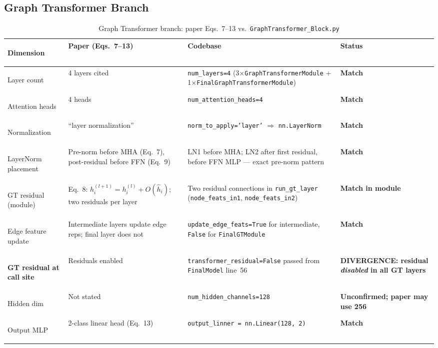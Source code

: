 \documentclass[10pt, a4paper]{article}
\newcommand{\match}[1]{\textcolor{okgreen}{\textbf{#1}}}
\newcommand{\mismatch}[1]{\textcolor{warnorange}{\textbf{#1}}}
\newcommand{\warn}[1]{\textcolor{warnorange}{\textbf{#1}}}
\newcommand{\code}[1]{\texttt{\small #1}}
\begin{document}
\subsection{Graph Transformer Branch}

\begin{table}[ht]
\caption{Graph Transformer branch: paper Eqs.\ 7--13 vs.\ \code{GraphTransformer\_Block.py}}
\label{tab:gt_compare}
\begin{tabularx}{\linewidth}{>{\footnotesize\bfseries\raggedright\arraybackslash}p{2.6cm} Y Y
    >{\footnotesize\centering\arraybackslash}p{2.8cm}}
\toprule
\normalsize\textbf{Dimension} & \normalsize\textbf{Paper (Eqs.\ 7--13)} & \normalsize\textbf{Codebase} & \normalsize\textbf{Status} \\
\midrule
Layer count &
  4 layers cited &
  \code{num\_layers=4} (3$\times$\code{GraphTransformerModule} + 1$\times$\code{FinalGraphTransformerModule}) &
  \match{Match} \\
\addlinespace
Attention heads & 4 heads & \code{num\_attention\_heads=4} & \match{Match} \\
\addlinespace
Normalization &
  ``layer normalization'' &
  \code{norm\_to\_apply='layer'} $\Rightarrow$ \code{nn.LayerNorm} &
  \match{Match} \\
\addlinespace
LayerNorm placement &
  Pre-norm before MHA (Eq.\ 7), post-residual before FFN (Eq.\ 9) &
  LN1 before MHA; LN2 after first residual, before FFN MLP --- exact pre-norm pattern &
  \match{Match} \\
\addlinespace
GT residual (module) &
  Eq.\ 8: $h_i^{(l+1)} = h_i^{(l)} + O(\hat{h}_i)$; two residuals per layer &
  Two residual connections in \code{run\_gt\_layer} (\code{node\_feats\_in1}, \code{node\_feats\_in2}) &
  \match{Match in module} \\
\addlinespace
Edge feature update &
  Intermediate layers update edge reps; final layer does not &
  \code{update\_edge\_feats=True} for intermediate, \code{False} for \code{FinalGTModule} &
  \match{Match} \\
\addlinespace
\textbf{GT residual at call site} &
  Residuals enabled &
  \code{transformer\_residual=False} passed from \code{FinalModel} line~56 &
  \mismatch{\textbf{DIVERGENCE}: residual \emph{disabled} in all GT layers} \\
\addlinespace
Hidden dim &
  Not stated &
  \code{num\_hidden\_channels=128} &
  \warn{Unconfirmed; paper may use 256} \\
\addlinespace
Output MLP &
  2-class linear head (Eq.\ 13) &
  \code{output\_linner = nn.Linear(128, 2)} &
  \match{Match} \\
\bottomrule
\end{tabularx}
\end{table}
\end{document}
